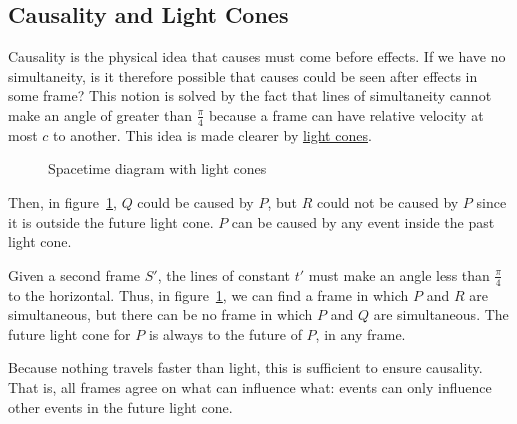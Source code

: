\documentclass[../Main.tex]{subfiles}
\begin{document}
\subsection{Causality and Light Cones}
Causality is the physical idea that causes must come before effects. If we have no simultaneity, is it therefore possible that causes could be seen after effects in some frame? This notion is solved by the fact that lines of simultaneity cannot make an angle of greater than $\frac{\pi}{4}$ because a frame can have relative velocity at most $c$ to another. This idea is made clearer by \underline{light cones}.
\begin{figure}[ht]
    \centering
    \caption{Spacetime diagram with light cones}
    \label{figLightCones}
\end{figure}
Then, in figure~\ref{figLightCones}, $Q$ could be caused by $P$, but $R$ could not be caused by $P$ since it is outside the future light cone. $P$ can be caused by any event inside the past light cone.\par
Given a second frame $S'$, the lines of constant $t'$ must make an angle less than $\frac{\pi}{4}$ to the horizontal. Thus, in figure~\ref{figLightCones}, we can find a frame in which $P$ and $R$ are simultaneous, but there can be no frame in which $P$ and $Q$ are simultaneous. The future light cone for $P$ is always to the future of $P$, in any frame.\par
Because nothing travels faster than light, this is sufficient to ensure causality. That is, all frames agree on what can influence what: events can only influence other events in the future light cone.
\end{document}
